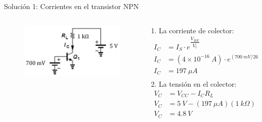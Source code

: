\documentclass[t,aspectratio=169]{beamer}
\begin{document}
\begin{frame}{Solución 1: Corrientes en el transistor NPN}

\begin{columns}
\begin{column}{0.5\textwidth}

\begin{figure}
    \includegraphics[width=6cm]{figures/ejemplo_1.png}
\end{figure}

\end{column}
\begin{column}{0.5\textwidth}

1. La corriente de colector:
%
\begin{align*}
I_C &= I_S \cdot e^{\dfrac{V_{BE}}{V_t}} \\
I_C &= (4\times{}10^{-16}\ A) \cdot e^{(700\ mV / 26\ mV)} \\
I_C &= 197\ \mu A \\
\end{align*}
%
2. La tensión en el colector:
%
\begin{align*}
V_C &= V_{CC} - I_C R_L \\
V_C &= 5\ V - (197\ \mu A) (1\ k\Omega) \\
V_C &= 4.8\ V
\end{align*}

\end{column}
\end{columns}

\end{frame}
\end{document}
